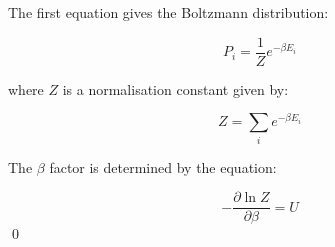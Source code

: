 \documentclass[12pt]{article}
\begin{document}
The first equation gives the Boltzmann distribution:

\begin{equation}
    P_{i} = \frac{1}{Z}e^{-\beta E_{i}}
\end{equation}

where $Z$ is a normalisation constant given by:

\begin{equation}
    Z = \sum_{i} e^{-\beta E_{i}}
\end{equation}

The $\beta$ factor is determined by the equation:

\begin{equation}
    -\frac{\partial \ln{Z}}{\partial \beta} = U
\end{equation}
\qed
\end{document}
